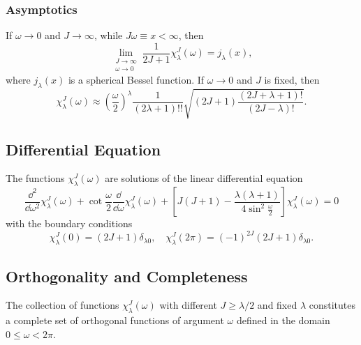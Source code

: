 \subsubsection{ Asymptotics}

If $\omega \rightarrow 0$ and $J \rightarrow \infty$, while $J \omega \equiv x<\infty$, then
\begin{equation}
\lim _{\substack{J \rightarrow \infty \\ \omega \rightarrow 0}} \frac{1}{2 J+1} \chi_{\lambda}^{J}(\omega)=j_{\lambda}(x) ,\label{eq:4:15:24}
\end{equation}
where $j_{\lambda}(x)$ is a spherical Bessel function. If $\omega \rightarrow 0$ and $J$ is fixed, then
\begin{equation}
\chi_{\lambda}^{J}(\omega) \approx\left(\frac{\omega}{2}\right)^{\lambda} \frac{1}{(2 \lambda+1)!!} \sqrt{(2 J+1) \frac{(2 J+\lambda+1)!}{(2 J-\lambda)!}} .\label{eq:4:15:25}
\end{equation}
\subsection{Differential Equation}\label{sec:4.15.4}
The functions $\chi_{\lambda}^{J}(\omega)$ are solutions of the linear differential equation
\begin{equation}
\frac{\dd^{2}}{\dd \omega^{2}} \chi_{\lambda}^{J}(\omega)+\cot \frac{\omega}{2} \frac{\dd}{\dd \omega} \chi_{\lambda}^{J}(\omega)+\left[J(J+1)-\frac{\lambda(\lambda+1)}{4 \sin ^{2} \frac{\omega}{2}}\right] \chi_{\lambda}^{J}(\omega)=0 \label{eq:4:15:26}
\end{equation}
with the boundary conditions
\begin{equation}
\chi_{\lambda}^{J}(0)=(2 J+1) \delta_{\lambda 0}, \quad \chi_{\lambda}^{J}(2 \pi)=(-1)^{2 J}(2 J+1) \delta_{\lambda 0} . \label{eq:4:15:27}
\end{equation}
\subsection{Orthogonality and Completeness}\label{sec:4.15.5}
The collection of functions $\chi_{\lambda}^{J}(\omega)$ with different $J \geq \lambda / 2$ and fixed $\lambda$ constitutes a complete set of orthogonal functions of argument $\omega$ defined in the domain $0 \leq \omega<2 \pi$.

